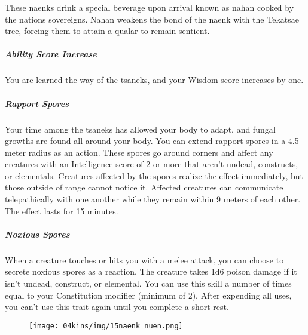     These naenks drink a special beverage upon arrival known as nahan cooked by the nations sovereigns.
    Nahan weakens the bond of the naenk with the Tekatsae tree, forcing them to attain a qualar to remain sentient.

    \subparagraph{Ability Score Increase} You are learned the way of the tsaneks, and your Wisdom score increases by one.

    \subparagraph{Rapport Spores} Your time among the tsaneks has allowed your body to adapt, and fungal growths are found all around your body.
    You can extend rapport spores in a 4.5 meter radius as an action.
    These spores go around corners and affect any creatures with an Intelligence score of 2 or more that aren't undead, constructs, or elementals.
    Creatures affected by the spores realize the effect immediately, but those outside of range cannot notice it.
    Affected creatures can communicate telepathically with one another while they remain within 9 meters of each other.
    The effect lasts for 15 minutes.

    \subparagraph{Noxious Spores} When a creature touches or hits you with a melee attack, you can choose to secrete noxious spores as a reaction.
    The creature takes 1d6 poison damage if it isn't undead, construct, or elemental.
    You can use this skill a number of times equal to your Constitution modifier (minimum of 2).
    After expending all uses, you can't use this trait again until you complete a short rest.

\begin{figure}[!b]
    \centering
    \texttt{[image: 04kins/img/15naenk\_nuen.png]}
\end{figure}

\newpage
